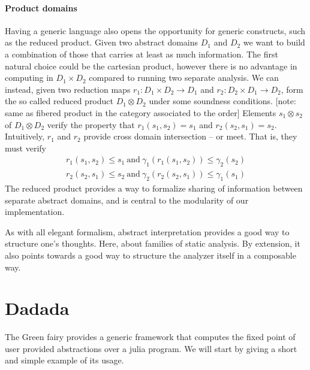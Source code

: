 \documentclass[11pt]{article}
\begin{document}
\paragraph{Product domains} Having a generic language also opens the opportunity for generic constructs, such as the reduced product. Given two abstract domains $D_1$ and $D_2$ we want to build a combination of those that carries at least as much information. The first natural choice could be the cartesian product, however there is no advantage in computing in $D_1\times D_2$ compared to running two separate analysis. We can instead, given two reduction maps $r_1:D_1\times D_2\to D_1$ and $r_2:D_2\times D_1\to D_2$, form the so called reduced product $D_1 \otimes D_2$ under some soundness conditions. [note: same as fibered product in the category associated to the order] Elements $s_1\otimes s_2$ of $D_1 \otimes D_2$ verify the property that $r_1(s_1,s_2) = s_1$ and $r_2(s_2,s_1) = s_2$. Intuitively, $r_1$ and $r_2$ provide cross domain intersection -- or meet. That is, they must verify
\begin{align*}
r_1(s_1,s_2) \leq s_1~\text{and}~ \gamma_1(r_1(s_1,s_2)) \leq \gamma_2(s_2) \\
r_2(s_2,s_1) \leq s_2~\text{and}~ \gamma_2(r_2(s_2,s_1)) \leq \gamma_1(s_1)
\end{align*}
The reduced product provides a way to formalize sharing of information between separate abstract domains, and is central to the modularity of our implementation.


As with all elegant formalism, abstract interpretation provides a good way to structure one's thoughts. Here, about families of static analysis. By extension, it also points towards a good way to structure the analyzer itself in a composable way.

\section*{Dadada}

The Green fairy provides a generic framework that computes the fixed point of user provided abstractions over a julia program. We will start by giving a short and simple example of its usage.
\end{document}
